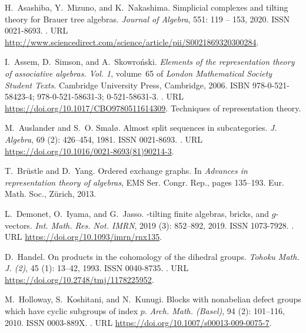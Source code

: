 \documentclass[pdftex,a4paper]{article}
\numberwithin{equation}{subsection}
\theoremstyle{definition}
\begin{document}
\begin{thebibliography}{23}
	H.~Asashiba, Y.~Mizuno, and K.~Nakashima.
	\newblock Simplicial complexes and tilting theory for {B}rauer tree algebras.
	\newblock \emph{Journal of Algebra}, 551: 119 -- 153, 2020.
	\newblock ISSN 0021-8693.
	\newblock {}.
	\newblock URL
	\url{http://www.sciencedirect.com/science/article/pii/S0021869320300284}.

	I.~Assem, D.~Simson, and A.~Skowro\'{n}ski.
	\newblock \emph{Elements of the representation theory of associative algebras.
			{V}ol. 1}, volume~65 of \emph{London Mathematical Society Student Texts}.
	\newblock Cambridge University Press, Cambridge, 2006.
	\newblock ISBN 978-0-521-58423-4; 978-0-521-58631-3; 0-521-58631-3.
	\newblock {}.
	\newblock URL \url{https://doi.org/10.1017/CBO9780511614309}.
	\newblock Techniques of representation theory.

	M.~Auslander and S.~O. Smal\o.
	\newblock Almost split sequences in subcategories.
	\newblock \emph{J. Algebra}, 69 (2): 426--454, 1981.
	\newblock ISSN 0021-8693.
	\newblock {}.
	\newblock URL \url{https://doi.org/10.1016/0021-8693(81)90214-3}.

	T.~Br\"{u}stle and D.~Yang.
	\newblock Ordered exchange graphs.
	\newblock In \emph{Advances in representation theory of algebras}, EMS Ser.
	Congr. Rep., pages 135--193. Eur. Math. Soc., Z\"{u}rich, 2013.

	L.~Demonet, O.~Iyama, and G.~Jasso.
	\newblock {$\tau$}-tilting finite algebras, bricks, and {$g$}-vectors.
	\newblock \emph{Int. Math. Res. Not. IMRN}, 2019 (3):
	852--892, 2019.
	\newblock ISSN 1073-7928.
	\newblock {}.
	\newblock URL \url{https://doi.org/10.1093/imrn/rnx135}.

	D.~Handel.
	\newblock On products in the cohomology of the dihedral groups.
	\newblock \emph{Tohoku Math. J. (2)}, 45 (1): 13--42, 1993.
	\newblock ISSN 0040-8735.
	\newblock {}.
	\newblock URL \url{https://doi.org/10.2748/tmj/1178225952}.

	M.~Holloway, S.~Koshitani, and N.~Kunugi.
	\newblock Blocks with nonabelian defect groups which have cyclic subgroups of
	index {$p$}.
	\newblock \emph{Arch. Math. (Basel)}, 94 (2): 101--116, 2010.
	\newblock ISSN 0003-889X.
	\newblock {}.
	\newblock URL \url{https://doi.org/10.1007/s00013-009-0075-7}.


\end{thebibliography}
\end{document}
